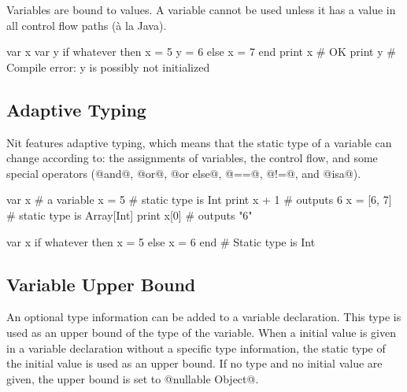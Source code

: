 Variables are bound to values.
A variable cannot be used unless it has a value in all control flow paths (\`a la Java).

\begin{lst}
var x
var y
if whatever then
	x = 5
	y = 6
else
	x = 7
end
print x # OK
print y # Compile error: y is possibly not initialized
\end{lst}

\subsection{Adaptive Typing}\label{adaptive typing}

Nit features adaptive typing, which means that the static type of a variable can change according to:
the assignments of variables,
the control flow,
and some special operators (@and@, @or@, @or else@, @==@, @!=@, and @isa@).

\begin{multicols}{2}
\begin{lst}
var x # a variable
x = 5
# static type is Int
print x + 1 # outputs 6
x = [6, 7]
# static type is Array[Int]
print x[0] # outputs "6"
\end{lst}
\columnbreak
\begin{lst}
var x
if whatever then
	x = 5
else
	x = 6
end
# Static type is Int
\end{lst}
\end{multicols}

\subsection{Variable Upper Bound}\label{upper bound}

An optional type information can be added to a variable declaration.
This type is used as an upper bound of the type of the variable.
When a initial value is given in a variable declaration without a specific type information, the static type of the initial value is used as an upper bound.
If no type and no initial value are given, the upper bound is set to @nullable Object@.


